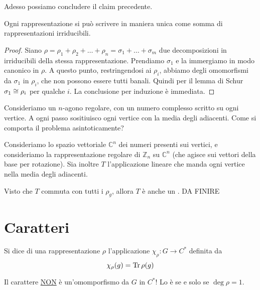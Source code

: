 \documentclass[a4paper,10pt,oneside]{math_article}
\newcommand{\Cyc}{\mathbb Z}
\begin{document}
    Adesso possiamo concludere il claim precedente.
    \begin{myprop}
     Ogni rappresentazione si può scrivere in maniera unica come somma di rappresentazioni irriducibili.
    \end{myprop}
    \begin{proof}
     Siano $\rho = \rho_1 + \rho_2 + \dots + \rho_n = \sigma_1 + \dots +\sigma_m$ due decomposizioni in irriducibili della stessa rappresentazione. Prendiamo $\sigma_1$ e la immergiamo in modo canonico in $\rho$. A questo punto, restringendosi ai $\rho_i$, abbiamo degli omomorfismi da $\sigma_1$ in $\rho_i$, che non possono essere tutti banali. Quindi per il lemma di Schur $\sigma_1\cong \rho_i$ per qualche $i$. La conclusione per induzione è immediata. 
    \end{proof}
  
  \begin{myex}
   Consideriamo un $n$-agono regolare, con un numero complesso scritto su ogni vertice. A ogni passo sositiuisco ogni vertice con la media degli adiacenti. Come si comporta il problema asintoticamente?
   
   Consideriamo lo spazio vettoriale $\mathbb C^n$ dei numeri presenti sui vertici, e consideriamo la rappresentazione regolare di $\Cyc_n$ su $\mathbb C^n$ (che agisce sui vettori della base per rotazione). Sia inoltre $T$ l'applicazione lineare che manda ogni vertice nella media degli adiacenti.
   
   Visto che $T$ commuta con tutti i $\rho_g$, allora $T$ è anche un . DA FINIRE
  \end{myex}

  
  \section{Caratteri}
    
    \begin{mydef}
     Si dice  di una rappresentazione $\rho$ l'applicazione $\chi_\rho: G \rightarrow C^*$ definita da 
     \[
      \chi_\rho(g)=\operatorname{Tr} \rho(g)
     \]
    \end{mydef}
    
    \begin{Achtung}
      Il carattere \underline{NON} è un'omomporfismo da $G$ in $C^*$! Lo è se e solo se $\deg \rho = 1$. 
    \end{Achtung}
\end{document}
